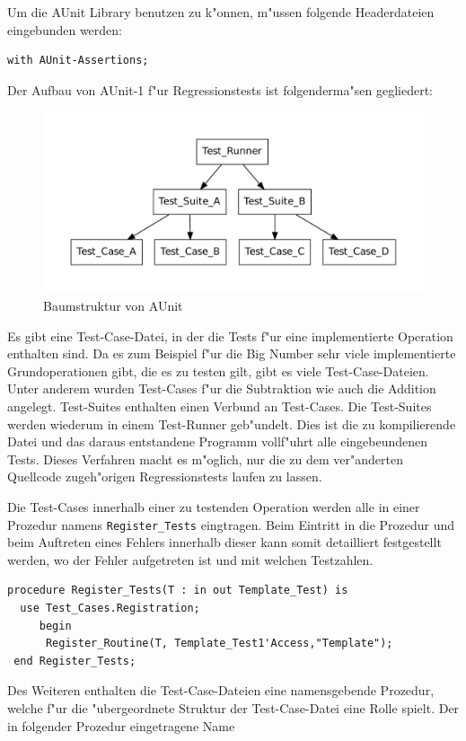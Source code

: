 Um die AUnit Library benutzen zu k"onnen, m"ussen folgende
Headerdateien eingebunden werden:
\begin{lstlisting}
with AUnit-Assertions; 
\end{lstlisting}
Der Aufbau von AUnit-1 f"ur Regressionstests ist folgenderma"sen gegliedert:
\begin{figure}[htp]
  \centering
  \includegraphics[scale=0.5,bb=0 0 385 567]{de/graph_aunit.pdf}
  \caption{Baumstruktur von AUnit}
\end{figure}
Es gibt eine Test-Case-Datei, in der die Tests f"ur eine
implementierte Operation enthalten sind.  Da es zum Beispiel f"ur die
Big Number sehr viele implementierte Grundoperationen gibt, die es zu
testen gilt, gibt es viele Test-Case-Dateien.  Unter anderem wurden
Test-Cases f"ur die Subtraktion wie auch die Addition angelegt.
Test-Suites enthalten einen Verbund an Test-Cases.  Die Test-Suites
werden wiederum in einem Test-Runner geb"undelt.  Dies ist die zu
kompilierende Datei und das daraus entstandene Programm vollf"uhrt
alle eingebeundenen Tests.  Dieses Verfahren macht es m"oglich, nur
die zu dem ver"anderten Quellcode zugeh"origen Regressionstests laufen
zu lassen.

Die Test-Cases innerhalb einer zu testenden Operation werden alle in
einer Prozedur namens {\tt Register\_Tests} eingtragen.  Beim Eintritt
in die Prozedur und beim Auftreten eines Fehlers innerhalb dieser kann
somit detailliert festgestellt werden, wo der Fehler aufgetreten ist
und mit welchen Testzahlen.

\begin{lstlisting}
procedure Register_Tests(T : in out Template_Test) is
  use Test_Cases.Registration;
     begin
      Register_Routine(T, Template_Test1'Access,"Template");
 end Register_Tests;
\end{lstlisting}

Des Weiteren enthalten die Test-Case-Dateien eine namensgebende
Prozedur, welche f"ur die "ubergeordnete Struktur der Test-Case-Datei
eine Rolle spielt.  Der in folgender Prozedur eingetragene Name

